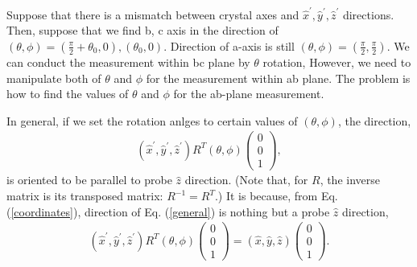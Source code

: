 \documentclass[a4,10.5pt]{report}
\begin{document}
Suppose that there is a mismatch between crystal axes and $\hat{x}^\prime, \hat{y}^\prime, \hat{z}^\prime$ directions.
Then, suppose that we find b, c axis in the direction of $(\theta,\phi) = (\frac{\pi}{2}+\theta_0,0), (\theta_0,0)$.
Direction of a-axis is still $(\theta,\phi) = (\frac{\pi}{2}, \frac{\pi}{2})$.
We can conduct the measurement within bc plane by $\theta$ rotation,
However, we need to manipulate both of $\theta$ and $\phi$ for the measurement within ab plane.
The problem is how to find the values of $\theta$ and $\phi$ for the ab-plane measurement. 

In general, if we set the rotation anlges to certain values of $(\theta,\phi)$, the direction,
\begin{align}
\label{general}
(\hat{x}^\prime, \hat{y}^\prime, \hat{z}^\prime) R^T (\theta, \phi) 
\left(
\begin{array}{c}
0 \\
0 \\
1
\end{array}
\right),
\end{align}
is oriented to be parallel to probe $\hat{z}$ direction.
(Note that, for $R$, the inverse matrix is its transposed matrix: $R^{-1} = R^T$.)
It is because, from Eq. (\ref{coordinates}), direction of Eq. (\ref{general}) is nothing but a probe $\hat{z}$ direction,
\begin{align}
(\hat{x}^\prime, \hat{y}^\prime, \hat{z}^\prime) R^T (\theta, \phi) 
\left(
\begin{array}{c}
0 \\
0 \\
1
\end{array}
\right)
= (\hat{x}, \hat{y}, \hat{z})
\left(
\begin{array}{c}
0 \\
0 \\
1
\end{array}
\right).
\end{align}
\end{document}
